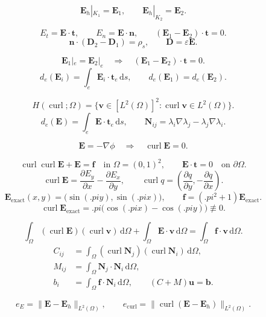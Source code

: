 \documentclass{article}
\begin{document}
\[
\mathbf E_h|_{K_1}=\mathbf E_1,\qquad
\mathbf E_h|_{K_2}=\mathbf E_2.
\]

\[
E_t=\mathbf E\cdot\mathbf t,\qquad
E_n=\mathbf E\cdot\mathbf n,
\qquad
(\mathbf E_1-\mathbf E_2)\cdot\mathbf t=0.
\]
\[
\mathbf n\cdot(\mathbf D_2-\mathbf D_1)=\rho_s,
\qquad \mathbf D=\varepsilon\mathbf E.
\]

\[
\mathbf E_1|_e=\mathbf E_2|_e
\quad\Longrightarrow\quad
(\mathbf E_1-\mathbf E_2)\cdot\mathbf t=0.
\]
\[
d_e(\mathbf E_i)=\int_e\mathbf E_i\cdot\mathbf t_e\,\mathrm ds,
\qquad d_e(\mathbf E_1)=d_e(\mathbf E_2).
\]

\[
H(\operatorname{curl};\Omega)
=\{\mathbf v\in[L^2(\Omega)]^2:
\operatorname{curl}\mathbf v\in L^2(\Omega)\}.
\]
\[
d_e(\mathbf E)=\int_e\mathbf E\cdot\mathbf t_e\,\mathrm ds,
\qquad
\mathbf N_{ij}=\lambda_i\nabla\lambda_j-\lambda_j\nabla\lambda_i.
\]

\[
\mathbf E=-\nabla\phi
\quad\Longrightarrow\quad
\operatorname{curl}\mathbf E=0.
\]

\[
\operatorname{curl}\operatorname{curl}\mathbf E+\mathbf E=\mathbf f
\quad\text{in }\Omega=(0,1)^2,
\qquad
\mathbf E\cdot\mathbf t=0\quad\text{on }\partial\Omega.
\]
\[
\operatorname{curl}\mathbf E
=\frac{\partial E_y}{\partial x}-\frac{\partial E_x}{\partial y},
\qquad
\operatorname{curl}q
=\left(\frac{\partial q}{\partial y},-\frac{\partial q}{\partial x}\right).
\]
\[
\mathbf E_{\mathrm{exact}}(x,y)
=\bigl(\sin(\bm.pi y),\sin(\bm.pi x)\bigr),
\qquad
\mathbf f=(\bm.pi^2+1)\mathbf E_{\mathrm{exact}}.
\]
\[
\operatorname{curl}\mathbf E_{\mathrm{exact}}
=\bm.pi\bigl(\cos(\bm.pi x)-\cos(\bm.pi y)\bigr)\not\equiv0.
\]

\[
\int_\Omega(\operatorname{curl}\mathbf E)(\operatorname{curl}\mathbf v)
\,\mathrm d\Omega
+\int_\Omega\mathbf E\cdot\mathbf v\,\mathrm d\Omega
=\int_\Omega\mathbf f\cdot\mathbf v\,\mathrm d\Omega.
\]
\[
\begin{aligned}
C_{ij}&=\int_\Omega
(\operatorname{curl}\mathbf N_j)(\operatorname{curl}\mathbf N_i)
\,\mathrm d\Omega,\\
M_{ij}&=\int_\Omega\mathbf N_j\cdot\mathbf N_i\,\mathrm d\Omega,\\
b_i&=\int_\Omega\mathbf f\cdot\mathbf N_i\,\mathrm d\Omega,
\qquad (C+M)\mathbf u=\mathbf b.
\end{aligned}
\]

\[
e_E=\|\mathbf E-\mathbf E_h\|_{L^2(\Omega)},
\qquad
e_{\mathrm{curl}}
=\|\operatorname{curl}(\mathbf E-\mathbf E_h)\|_{L^2(\Omega)}.
\]
\end{document}
